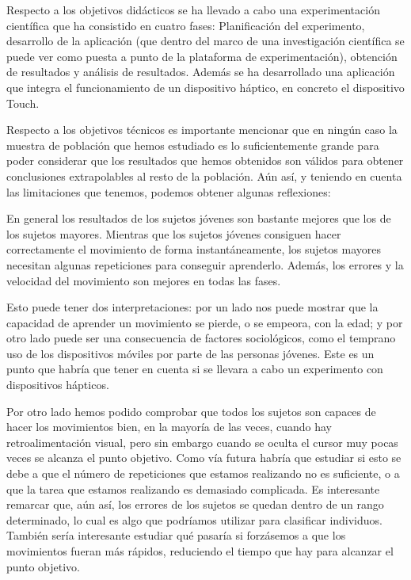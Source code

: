 \documentclass[a4paper,11pt, oneside]{book}
\begin{document}
Respecto a los objetivos didácticos se ha llevado a cabo una experimentación científica que ha consistido en cuatro fases: Planificación del experimento, desarrollo de la aplicación (que dentro del marco de una investigación científica se puede ver como puesta a punto de la plataforma de experimentación), obtención de resultados y análisis de resultados. Además se ha desarrollado una aplicación que integra el funcionamiento de un dispositivo háptico, en concreto el dispositivo Touch.

Respecto a los objetivos técnicos es importante mencionar que en ningún caso la muestra de población que hemos estudiado es lo suficientemente grande para poder considerar que los resultados que hemos obtenidos son válidos para obtener conclusiones extrapolables al resto de la población. Aún así, y teniendo en cuenta las limitaciones que tenemos, podemos obtener algunas reflexiones:

En general los resultados de los sujetos jóvenes son bastante mejores que los de los sujetos mayores. Mientras que los sujetos jóvenes consiguen hacer correctamente el movimiento de forma instantáneamente, los sujetos mayores necesitan algunas repeticiones para conseguir aprenderlo. Además, los errores y la velocidad del movimiento son mejores en todas las fases.

Esto puede tener dos interpretaciones: por un lado nos puede mostrar que la capacidad de aprender un movimiento se pierde, o se empeora, con la edad; y por otro lado puede ser una consecuencia de factores sociológicos, como el temprano uso de los dispositivos móviles por parte de las personas jóvenes. Este es un punto que habría que tener en cuenta si se llevara a cabo un experimento con dispositivos hápticos.

Por otro lado hemos podido comprobar que todos los sujetos son capaces de hacer los movimientos bien, en la mayoría de las veces, cuando hay retroalimentación visual, pero sin embargo cuando se oculta el cursor muy pocas veces se alcanza el punto objetivo. Como vía futura habría que estudiar si esto se debe a que el número de repeticiones que estamos realizando no es suficiente, o a que la tarea que estamos realizando es demasiado complicada. Es interesante remarcar que, aún así, los errores de los sujetos se quedan dentro de un rango determinado, lo cual es algo que podríamos utilizar para clasificar individuos. También sería interesante estudiar qué pasaría si forzásemos a que los movimientos fueran más rápidos, reduciendo el tiempo que hay para alcanzar el punto objetivo.
\end{document}
